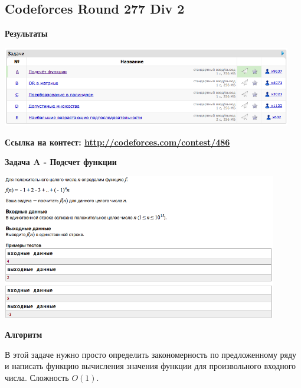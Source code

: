 \documentclass[a4paper,12pt]{article}
\begin{document}
%
%

\newpage
\subsection{Codeforces Round 277 Div 2}

\textbf{{\large Результаты}} \\
\begin{center}
\includegraphics[width=0.95\textwidth]{C_277/result.png}\\ [1cm]
\end{center}

\textbf{{\large Ссылка на контест: \url{http://codeforces.com/contest/486}}}

\newpage
\textbf{{\large Задача A - Подсчет функции}}

\begin{center}
\includegraphics[width=0.9\textwidth]{C_277/A.png}\\ [1cm]
\end{center}

\textbf{{\large Алгоритм}}

В этой задаче нужно просто определить закономерность по предложенному ряду и написать функцию вычисления значения функции для произвольного входного числа. Сложность $O(1)$.\\
\end{document}
